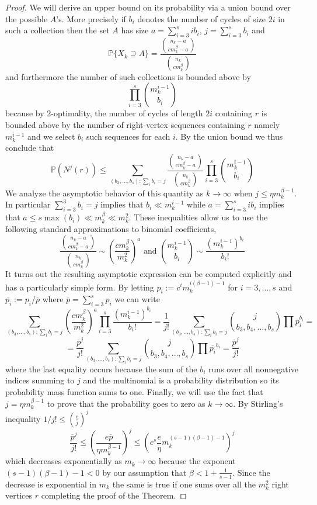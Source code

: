 \documentclass[12pt]{amsart}
\theoremstyle{definition}
\renewcommand{\leq}{\leqslant}
\newcommand{\PP}{\ensuremath{\mathbb{P}}}
\newcommand{\1}{\ensuremath{\mathbb{1}}}
\begin{document}
\begin{proof}
We will derive an upper bound on its probability via a union bound over the possible $A$'s. More precisely if $b_i$ denotes the number of cycles of size $2i$ in such a collection then the set $A$ has size $a=\sum_{i=3}^s ib_i$, $j=\sum_{i=3}^sb_i$ and 
\[\PP\{X_k\supseteq A\}= \frac{\binom{n_k -a}{cm_k^\beta-a}}{\binom{n_k}{cm_k^\beta}}\]
and furthermore the number of such collections is bounded above by
\[\prod_{i=3}^s \binom{m_k^{i-1}}{b_i}\]
because by $2$-optimality, the number of cycles of length $2i$ containing $r$ is bounded above by the number of right-vertex sequences containing $r$ namely $m_k^{i-1}$ and we select $b_i$ such sequences for each $i$. 
By the union bound we thus conclude that
\[\PP(N^j(r))\leq \sum_{(b_3,\dots,b_s): \sum_i b_i=j} \frac{\binom{n_k -a}{cm_k^\beta-a}}{\binom{n_k}{cm_k^\beta}}\prod_{i=3}^s \binom{m_k^{i-1}}{b_i}\]
We analyze the asymptotic behavior of this quantity as $k\rightarrow \infty$ when $j\leq \eta m_k^{\beta-1}$. In particular $\sum_{i=3}^3 b_i=j$ implies that $b_i\ll m_k^{i-1}$ while $a=\sum_{i=3}^s ib_i$ implies that $a\leq s\max(b_i)\ll m_k^\beta\ll m_k^2$. These inequalities allow us to use the following standard approximations to binomial coefficients,
\[\frac{\binom{n_k -a}{cm_k^\beta-a}}{\binom{n_k}{cm_k^\beta}} \sim \left(\frac{cm_k^\beta}{m_k^2}\right)^{a} \text{ and } \binom{m_k^{i-1}}{b_i}\sim \frac{(m_k^{i-1})^{b_i}}{b_i!}\]
It turns out the resulting asymptotic expression can be computed explicitly and has a particularly simple form. By letting $p_i:= c^i m_k^{i(\beta-1)-1}$ for  $i=3,\dots, s$ and $\overline{p_i}:=p_i/\overline{p}$ where $\overline{p}=\sum_{i=3}^sp_i$ we can write
\[
\sum_{(b_3,\dots,b_s): \sum_i b_i=j} \left(\frac{cm_k^\beta}{m_k^2}\right)^{a}\prod_{i=3}^s \frac{(m_k^{i-1})^{b_i}}{b_i!} = \frac{1}{j!}\sum_{(b_3,\dots,b_s): \sum_i b_i=j} \binom{j}{b_3, b_4, \dots, b_s} \prod p_i^{b_i}=\]
\[=\frac{\overline{p}^j}{j!} \sum_{(b_3,\dots,b_s): \sum_i b_i=j} \binom{j}{b_3, b_4, \dots, b_s} \prod \overline{p_i}^{b_i} = \frac{\overline{p}^j}{j!}
\]
where the last equality occurs because the sum of the $b_i$ runs over all nonnegative indices summing to $j$ and the multinomial is a probability distribution so its probability mass function sums to one.    
Finally, we will use the fact that $j=\eta m_k^{\beta-1}$ to prove that the probability goes to zero as $k\rightarrow \infty$. By Stirling's inequality $1/j!\leq (\frac{e}{j})^j$
\[\frac{\overline{p}^j}{j!}\leq \left(\frac{e\overline{p}}{\eta m_k^{\beta-1}}\right)^j\leq \left(c^s\frac{e}{\eta} m_k^{(s-1)(\beta-1)-1}\right)^j\]
which decreases exponentially as $m_k\rightarrow \infty$ because the exponent $(s-1)(\beta-1)-1<0$ by our assumption that $\beta<1+\frac{1}{s-1}$. Since the decrease is exponential in $m_k$ the same is true if one sums over all the $m_k^2$ right vertices $r$ completing the proof of the Theorem.
\end{proof}
\end{document}
